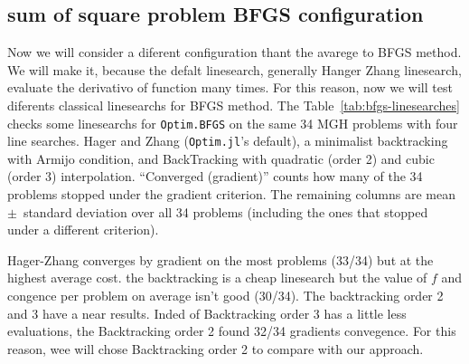 \documentclass[11pt]{article}
\begin{document}
\subsection{sum of square problem BFGS configuration}

Now we will consider a diferent configuration thant the avarege to BFGS method. We will make it, because the defalt linesearch, generally Hanger Zhang linesearch, evaluate the derivativo of function many times. For this reason, now we will test diferents classical linesearchs for BFGS method. The Table~\ref{tab:bfgs-linesearches} checks some linesearchs for
\texttt{Optim.BFGS} on the same 34 MGH problems with four line searches. Hager and Zhang (\texttt{Optim.jl}'s default), a
minimalist backtracking with Armijo condition, and BackTracking
with quadratic (order 2) and cubic (order 3) interpolation. ``Converged
(gradient)'' counts how many of the 34 problems stopped under the gradient
criterion. The remaining columns are mean~$\pm$~standard deviation over
all 34 problems (including the ones that stopped under a different
criterion).

\begin{table}[htbp]
	\centering
	\caption{Comparison of line searches for Optim.jl's BFGS on the 34 MGH problems.}
	\label{tab:bfgs-linesearches}
\end{table}
\FloatBarrier

\noindent
Hager-Zhang converges by gradient on the most problems (33/34) but at the
highest average cost. the backtracking is a cheap linesearch but the value of $f$  and congence per
problem on average isn't good (30/34). The backtracking order 2 and 3 have a near results. Inded of Backtracking order 3 has a little less evaluations, the Backtracking order 2 found 32/34 gradients convegence. For this reason, wee will chose Backtracking order 2 to compare with our approach. 
\end{document}

